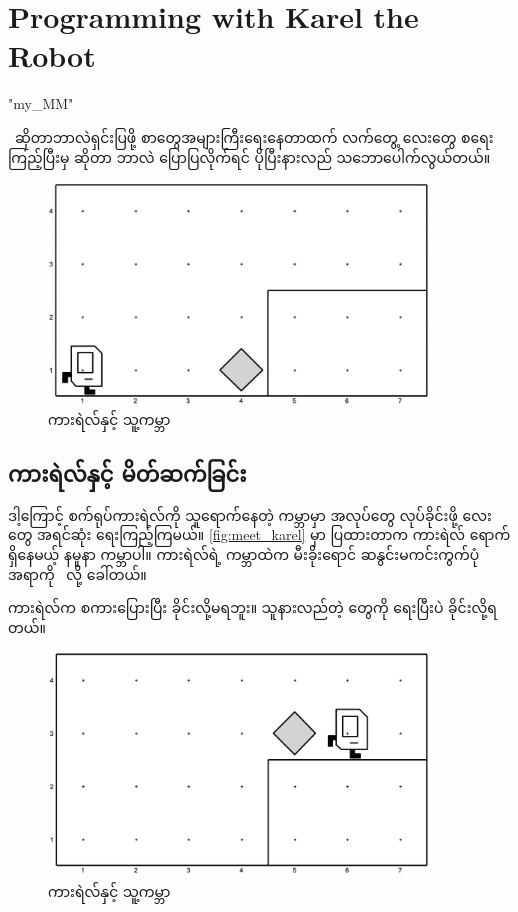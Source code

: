 
\chapter{Programming with Karel the Robot}
\XeTeXlinebreaklocale "my_MM"  %
\begin{sloppypar}



\enprogramming\ ဆိုတာဘာလဲရှင်းပြဖို့ စာတွေအများကြီးရေးနေတာထက် လက်တွေ့ \enprogram လေးတွေ စရေးကြည့်ပြီးမှ \mmprogramming ဆိုတာ ဘာလဲ ပြောပြလိုက်ရင် ပိုပြီးနားလည် သဘောပေါက်လွယ်တယ်။ 

\begin{figure}[h]
    \caption{ကားရဲလ်နှင့်  သူ့ကမ္ဘာ}\label{fig:meet_karel}
    \includegraphics[width=4in, left]{ch01/meet_karel.jpg}
\end{figure}



\section{ကားရဲလ်နှင့် မိတ်ဆက်ခြင်း}
ဒါ့ကြောင့် စက်ရုပ်ကားရဲလ်ကို သူရောက်နေတဲ့ ကမ္ဘာမှာ အလုပ်တွေ လုပ်ခိုင်းဖို့ \mmprogram လေးတွေ  အရင်ဆုံး ရေးကြည့်ကြမယ်။ \Fig \vref*{fig:meet_karel} မှာ ပြထားတာက ကားရဲလ် ရောက်ရှိနေမယ့် နမူနာ ကမ္ဘာပါ။ ကားရဲလ်ရဲ့ ကမ္ဘာထဲက မီးခိုးရောင် ဆနွင်းမကင်းကွက်ပုံ အရာကို \enbeeper\ လို့ ခေါ်တယ်။ 

 ကားရဲလ်က စကားပြေားပြီး ခိုင်းလို့မရဘူး။ သူနားလည်တဲ့ \encommand တွေကို \mmprogram ရေးပြီးပဲ ခိုင်းလို့ရတယ်။ 

\begin{figure}[tbh!]
    \caption{ကားရဲလ်နှင့်  သူ့ကမ္ဘာ}\label{fig:meet_karel_aft}
    \includegraphics[width=4in, left]{ch01/meet_karel_aft.jpg}
\end{figure}




\end{sloppypar}
